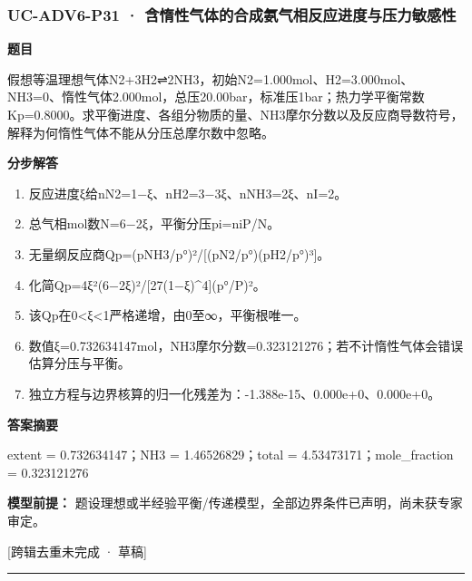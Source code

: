 \documentclass[UTF8,11pt,a4paper]{ctexart}
\begin{document}
\subsubsection*{UC-ADV6-P31 · 含惰性气体的合成氨气相反应进度与压力敏感性}
\noindent\textbf{题目}\par
假想等温理想气体N2+3H2⇌2NH3，初始N2=1.000mol、H2=3.000mol、NH3=0、惰性气体2.000mol，总压20.00bar，标准压1bar；热力学平衡常数Kp=0.8000。求平衡进度、各组分物质的量、NH3摩尔分数以及反应商导数符号，解释为何惰性气体不能从分压总摩尔数中忽略。\par
\medskip\noindent\textbf{分步解答}
\begin{enumerate}
\item 反应进度ξ给nN2=1−ξ、nH2=3−3ξ、nNH3=2ξ、nI=2。
\item 总气相mol数N=6−2ξ，平衡分压pi=niP/N。
\item 无量纲反应商Qp=(pNH3/p°)²/[(pN2/p°)(pH2/p°)³]。
\item 化简Qp=4ξ²(6−2ξ)²/[27(1−ξ)\textasciicircum{}4](p°/P)²。
\item 该Qp在0<ξ<1严格递增，由0至∞，平衡根唯一。
\item 数值ξ=0.732634147mol，NH3摩尔分数=0.323121276；若不计惰性气体会错误估算分压与平衡。
\item 独立方程与边界核算的归一化残差为：-1.388e-15、0.000e+0、0.000e+0。
\end{enumerate}
\noindent\textbf{答案摘要}\par
extent = 0.732634147；NH3 = 1.46526829；total = 4.53473171；mole\_fraction = 0.323121276\par
\noindent\textbf{模型前提：}
题设理想或半经验平衡/传递模型，全部边界条件已声明，尚未获专家审定。\par
\noindent\textcolor{red!65!black}{[跨辑去重未完成 · 草稿]} \par
\medskip\hrule\medskip
{}
\end{document}
